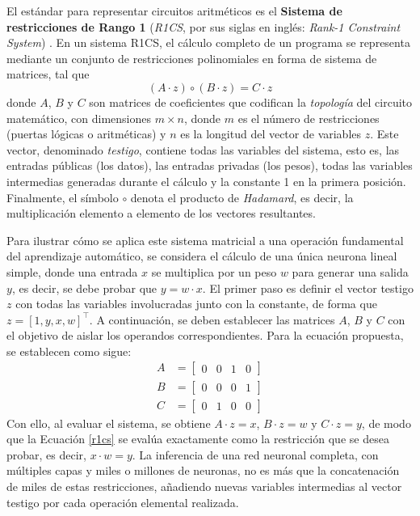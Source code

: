 \documentclass[a4paper, 11pt]{article}
\begin{document}
El estándar para representar circuitos aritméticos es el \textbf{Sistema de restricciones de Rango 1}
(\textit{R1CS}, por sus siglas en inglés: \textit{Rank-1 Constraint System}) \cite[Capítulo~8]{thaler2022proofs}.
En un sistema R1CS, el cálculo completo de un programa se representa mediante un conjunto de restricciones
polinomiales en forma de sistema de matrices, tal que
\begin{equation}
  (A \cdot z) \circ (B \cdot z) = C \cdot z \label{r1cs}
\end{equation}
donde $A$, $B$ y $C$ son matrices de coeficientes que codifican la \textit{topología} del circuito
matemático, con dimensiones $m \times n$, donde $m$ es el número de restricciones (puertas lógicas o
aritméticas) y $n$ es la longitud del vector de variables $z$. Este vector, denominado \textit{testigo},
contiene todas las variables del sistema, esto es, las entradas públicas (los datos), las entradas
privadas (los pesos), todas las variables intermedias generadas durante el cálculo y la constante 1
en la primera posición. Finalmente, el símbolo $\circ$ denota el producto de \textit{Hadamard}, es
decir, la multiplicación elemento a elemento de los vectores resultantes.

Para ilustrar cómo se aplica este sistema matricial a una operación fundamental del aprendizaje
automático, se considera el cálculo de una única neurona lineal simple, donde una entrada $x$ se
multiplica por un peso $w$ para generar una salida $y$, es decir, se debe probar que $y = w \cdot x$.
El primer paso es definir el vector testigo $z$ con todas las variables involucradas junto con la
constante, de forma que $z = [1, y, x, w]^{\intercal}$. A continuación, se deben establecer las
matrices $A$, $B$ y $C$ con el objetivo de aislar los operandos correspondientes. Para la ecuación
propuesta, se establecen como sigue:
\begin{align*}
  A & = \begin{bmatrix} 0 & 0 & 1 & 0 \end{bmatrix} \\
  B & = \begin{bmatrix} 0 & 0 & 0 & 1 \end{bmatrix} \\
  C & = \begin{bmatrix} 0 & 1 & 0 & 0 \end{bmatrix}
\end{align*}
Con ello, al evaluar el sistema, se obtiene $A \cdot z = x$, $B \cdot z = w$ y $C \cdot z = y$, de modo
que la Ecuación \ref{r1cs} se evalúa exactamente como la restricción que se desea probar, es decir,
$x \cdot w = y$. La inferencia de una red neuronal completa, con múltiples capas y miles o millones
de neuronas, no es más que la concatenación de miles de estas restricciones, añadiendo nuevas variables
intermedias al vector testigo por cada operación elemental realizada.
\end{document}
